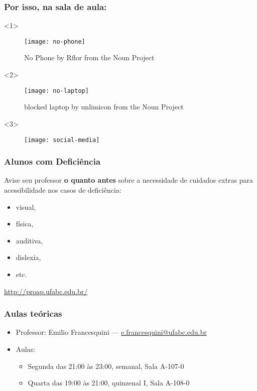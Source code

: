 \documentclass[Ligatures=TeX,table,brazil,svgnames,usetotalslideindicator,comp
ress,10pt]{beamer}
\begin{document}
\begin{frame}
  \frametitle{Por isso, na sala de aula:}

  \begin{onlyenv}<1>
    \begin{figure}
      \centering
      \texttt{[image: no-phone]}
      \begin{flushright}
        \tiny
        No Phone by Rflor from the Noun Project
      \end{flushright}
    \end{figure}
  \end{onlyenv}

  \begin{onlyenv}<2>
    \begin{figure}
      \centering
      \texttt{[image: no-laptop]}
      \begin{flushright}
        \tiny
        blocked laptop by unlimicon from the Noun Project
      \end{flushright}
    \end{figure}
  \end{onlyenv}

    \begin{onlyenv}<3>
    \begin{figure}
      \centering
      \texttt{[image: social-media]}
    \end{figure}
  \end{onlyenv}
\end{frame}

\begin{frame}
  \frametitle{Alunos com Deficiência}

  Avise seu professor \textbf{o quanto antes} sobre a necessidade de cuidados extras para acessibilidade nos casos de deficiência:
  \begin{itemize}
  \item visual,
  \item física,
  \item auditiva,
  \item dislexia,
  \item etc.
  \end{itemize}

  \url{http://proap.ufabc.edu.br/}

\end{frame}

\begin{frame}
  \frametitle{Aulas teóricas}

  \begin{itemize}
  \item Professor: Emilio Francesquini --- \url{e.francesquini@ufabc.edu.br}
  \item Aulas:
    \begin{itemize}
    \item Segunda das 21:00 às 23:00, semanal, Sala A-107-0
    \item Quarta das 19:00 às 21:00, quinzenal I, Sala A-108-0
    \end{itemize}
  \end{itemize}
\end{frame}
\end{document}

